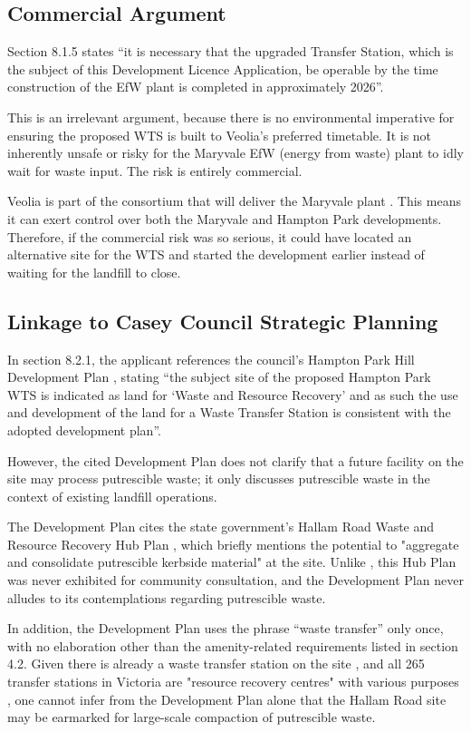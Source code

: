 \documentclass{article}
\begin{document}
\subsection{Commercial Argument}

Section 8.1.5 states “it is necessary that the upgraded Transfer Station, which is the subject of this Development Licence Application, be operable by the time construction of the EfW plant is completed in approximately 2026”.

This is an irrelevant argument, because there is no environmental imperative for ensuring the proposed WTS is built to Veolia's preferred timetable. It is not inherently unsafe or risky for the Maryvale EfW (energy from waste) plant to idly wait for waste input. The risk is entirely commercial. 

Veolia is part of the consortium that will deliver the Maryvale plant \cite{maryvaleefw}. This means it can exert control over both the Maryvale and Hampton Park developments. Therefore, if the commercial risk was so serious, it could have located an alternative site for the WTS and started the development earlier instead of waiting for the landfill to close.

\subsection{Linkage to Casey Council Strategic Planning}

In section 8.2.1, the applicant references the council’s Hampton Park Hill Development Plan \cite{caseyhph}, stating “the subject site of the proposed Hampton Park WTS is indicated as land for ‘Waste and Resource Recovery’ and as such the use and development of the land for a Waste Transfer Station is consistent with the adopted development plan”.

However, the cited Development Plan does not clarify that a future facility on the site may process putrescible waste; it only discusses putrescible waste in the context of existing landfill operations. 

The Development Plan cites the state government's Hallam Road Waste and Resource Recovery Hub Plan \cite{hubplan}, which briefly mentions the potential to "aggregate and consolidate putrescible kerbside material" at the site. Unlike \cite{caseyhph}, this Hub Plan was never exhibited for community consultation, and the Development Plan never alludes to its contemplations regarding putrescible waste. 

In addition, the Development Plan uses the phrase “waste transfer” only once, with no elaboration other than the amenity-related requirements listed in section 4.2. Given there is already a waste transfer station on the site \cite{outlook}, and all 265 transfer stations in Victoria are "resource recovery centres" with various purposes \cite{vicwastemap}, one cannot infer from the Development Plan alone that the Hallam Road site may be earmarked for large-scale compaction of putrescible waste.  
\end{document}
